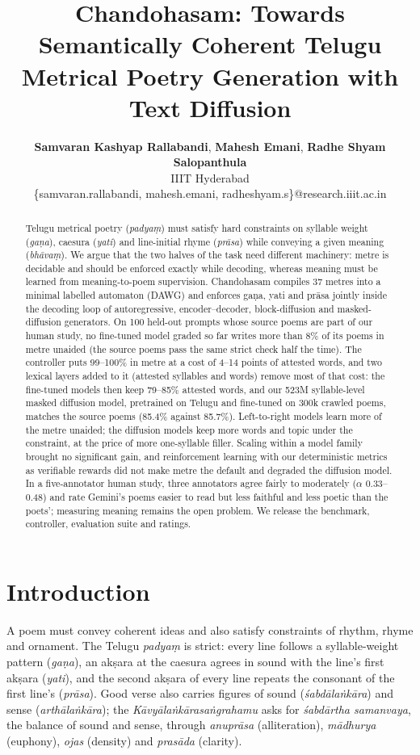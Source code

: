 \documentclass[11pt]{article}
\title{Chandohasam: Towards Semantically Coherent Telugu Metrical Poetry Generation with Text Diffusion}
\author{
 \textbf{Samvaran Kashyap Rallabandi},
 \textbf{Mahesh Emani},
 \textbf{Radhe Shyam Salopanthula}
\\
 IIIT Hyderabad
\\
 \small{\{samvaran.rallabandi, mahesh.emani, radheshyam.s\}@research.iiit.ac.in}
}
\begin{document}
\maketitle

\begin{abstract}
Telugu metrical poetry (\textit{padyaṃ}) must satisfy hard constraints on syllable weight (\textit{gaṇa}),
caesura (\textit{yati}) and line-initial rhyme (\textit{prāsa}) while conveying a given meaning
(\textit{bhāvaṃ}). We argue that the two halves of the task need different machinery: metre is decidable and
should be enforced exactly while decoding, whereas meaning must be learned from meaning-to-poem supervision.
Chandohasam compiles 37 metres into a minimal labelled automaton (DAWG) and enforces gaṇa, yati and prāsa
jointly inside the decoding loop of autoregressive, encoder--decoder, block-diffusion and masked-diffusion
generators. On 100 held-out prompts whose source poems are part of our human study, no fine-tuned model graded so
far writes more than 8\% of its poems in metre unaided (the source poems pass the same strict check half the
time). The controller puts 99--100\% in metre at a cost of 4--14 points of attested words, and two lexical layers
added to it (attested syllables and words) remove most of that cost: the fine-tuned models then keep 79--85\%
attested words, and our 523M syllable-level masked diffusion model, pretrained on Telugu and fine-tuned on 300k
crawled poems, matches the source poems (85.4\% against 85.7\%). Left-to-right models learn more of the metre
unaided; the diffusion models keep more words and topic under the constraint, at the price of more one-syllable
filler. Scaling within a model family brought no significant gain, and reinforcement learning with our
deterministic metrics as verifiable rewards did not make metre the default and degraded the diffusion model. In
a five-annotator human study, three annotators agree fairly to moderately ($\alpha$ 0.33--0.48) and rate
Gemini's poems easier to read but less faithful and less poetic than the poets'; measuring meaning remains the
open problem. We release the benchmark, controller, evaluation suite and ratings.
\end{abstract}

\section{Introduction}\label{sec:intro}

A poem must convey coherent ideas and also satisfy constraints of rhythm, rhyme and ornament. The Telugu
\textit{padyaṃ} is strict: every line follows a syllable-weight pattern (\textit{gaṇa}), an akṣara at the
caesura agrees in sound with the line's first akṣara (\textit{yati}), and the second akṣara of every line
repeats the consonant of the first line's (\textit{prāsa}). Good verse also carries figures of sound
(\textit{śabdālaṅkāra}) and sense (\textit{arthālaṅkāra}); the \textit{Kāvyālaṅkārasaṅgrahamu}
\citep{ramarajabhushana_kas1920} asks for \textit{śabdārtha samanvaya}, the balance of sound and sense, through
\textit{anuprāsa} (alliteration), \textit{mādhurya} (euphony), \textit{ojas} (density) and \textit{prasāda}
(clarity).
\end{document}
